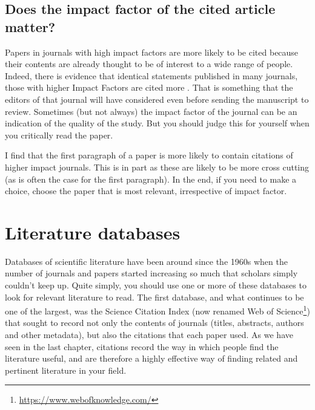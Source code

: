 \documentclass[
]{krantz}
\renewcommand{\href}[2]{#2\footnote{\url{#1}}}
\begin{document}
\hypertarget{does-the-impact-factor-of-the-cited-article-matter}{%
\subsection{Does the impact factor of the cited article matter?}\label{does-the-impact-factor-of-the-cited-article-matter}}

Papers in journals with high impact factors are more likely to be cited because their contents are already thought to be of interest to a wide range of people. Indeed, there is evidence that identical statements published in many journals, those with higher Impact Factors are cited more \citep{perneger2010citation}. That is something that the editors of that journal will have considered even before sending the manuscript to review. Sometimes (but not always) the impact factor of the journal can be an indication of the quality of the study. But you should judge this for yourself when you critically read the paper.

I find that the first paragraph of a paper is more likely to contain citations of higher impact journals. This is in part as these are likely to be more cross cutting (as is often the case for the first paragraph). In the end, if you need to make a choice, choose the paper that is most relevant, irrespective of impact factor.

\hypertarget{databases}{%
\section{Literature databases}\label{databases}}

Databases of scientific literature have been around since the 1960s when the number of journals and papers started increasing so much that scholars simply couldn't keep up. Quite simply, you should use one or more of these databases to look for relevant literature to read. The first database, and what continues to be one of the largest, was the Science Citation Index (now renamed \href{https://www.webofknowledge.com/}{Web of Science}) that sought to record not only the contents of journals (titles, abstracts, authors and other metadata), but also the citations that each paper used. As we have seen in the last chapter, citations record the way in which people find the literature useful, and are therefore a highly effective way of finding related and pertinent literature in your field.
\end{document}
